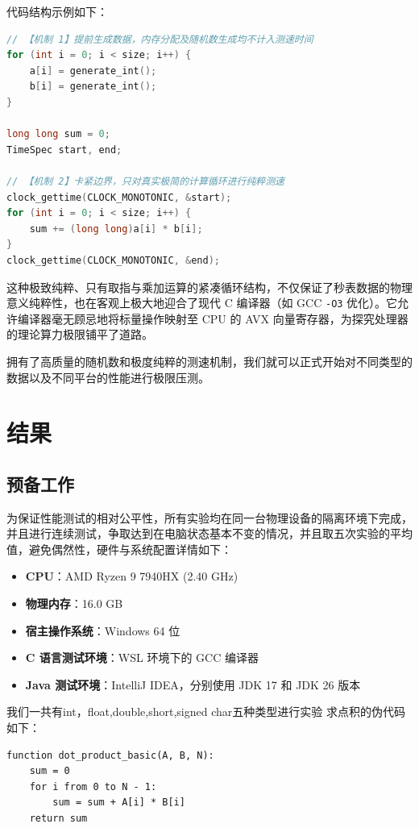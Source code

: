 \documentclass[UTF8]{ctexart}
\begin{document}
代码结构示例如下：
\begin{lstlisting}[language=C]
// 【机制 1】提前生成数据，内存分配及随机数生成均不计入测速时间
for (int i = 0; i < size; i++) {
    a[i] = generate_int();
    b[i] = generate_int();
}

long long sum = 0;
TimeSpec start, end;

// 【机制 2】卡紧边界，只对真实极简的计算循环进行纯粹测速
clock_gettime(CLOCK_MONOTONIC, &start);
for (int i = 0; i < size; i++) {
    sum += (long long)a[i] * b[i];
}
clock_gettime(CLOCK_MONOTONIC, &end);
\end{lstlisting}

这种极致纯粹、只有取指与乘加运算的紧凑循环结构，不仅保证了秒表数据的物理意义纯粹性，也在客观上极大地迎合了现代 C 编译器（如 GCC \texttt{-O3} 优化）。它允许编译器毫无顾忌地将标量操作映射至 CPU 的 AVX 向量寄存器，为探究处理器的理论算力极限铺平了道路。

拥有了高质量的随机数和极度纯粹的测速机制，我们就可以正式开始对不同类型的数据以及不同平台的性能进行极限压测。

\section{结果}
\subsection{预备工作}
为保证性能测试的相对公平性，所有实验均在同一台物理设备的隔离环境下完成，并且进行连续测试，争取达到在电脑状态基本不变的情况，并且取五次实验的平均值，避免偶然性，硬件与系统配置详情如下：
\begin{itemize}
    \item \textbf{CPU}：AMD Ryzen 9 7940HX (2.40 GHz)
    \item \textbf{物理内存}：16.0 GB
    \item \textbf{宿主操作系统}：Windows 64 位
    \item \textbf{C 语言测试环境}：WSL 环境下的 GCC 编译器
    \item \textbf{Java 测试环境}：IntelliJ IDEA，分别使用 JDK 17 和 JDK 26 版本
\end{itemize}
我们一共有int，float,double,short,signed char五种类型进行实验
求点积的伪代码如下：
\begin{lstlisting}
function dot_product_basic(A, B, N):
    sum = 0
    for i from 0 to N - 1:
        sum = sum + A[i] * B[i]
    return sum
\end{lstlisting}
\end{document}
